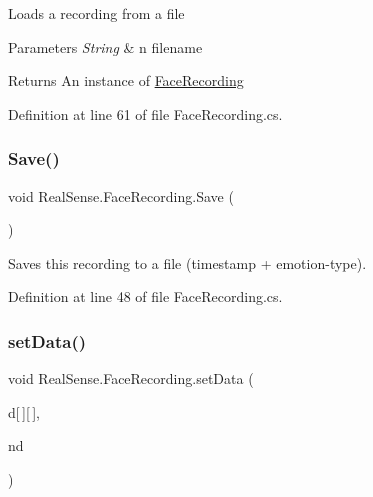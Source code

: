 Loads a recording from a file 
\begin{DoxyParams}{Parameters}
{\em String} & n filename \\
\hline
\end{DoxyParams}
\begin{DoxyReturn}{Returns}
An instance of \hyperlink{class_real_sense_1_1_face_recording}{Face\+Recording} 
\end{DoxyReturn}


Definition at line 61 of file Face\+Recording.\+cs.

\mbox{\label{class_real_sense_1_1_face_recording_a856729fd53a364765b202b3a9fb6f5dd}} 
\subsubsection{\texorpdfstring{Save()}{Save()}}
{\footnotesize\ttfamily void Real\+Sense.\+Face\+Recording.\+Save (\begin{DoxyParamCaption}{ }\end{DoxyParamCaption})}

Saves this recording to a file (timestamp + emotion-\/type). 

Definition at line 48 of file Face\+Recording.\+cs.

\mbox{\label{class_real_sense_1_1_face_recording_a94e9208ed4f1fe15264ab3b2293f3ce4}} 
\subsubsection{\texorpdfstring{set\+Data()}{setData()}}
{\footnotesize\ttfamily void Real\+Sense.\+Face\+Recording.\+set\+Data (\begin{DoxyParamCaption}\item[{P\+X\+C\+M\+Face\+Data.\+Landmark\+Point}]{d\mbox{[}$\,$\mbox{]}\mbox{[}$\,$\mbox{]},  }\item[{P\+X\+C\+M\+Face\+Data.\+Landmark\+Point \mbox{[}$\,$\mbox{]}}]{nd }\end{DoxyParamCaption})}

